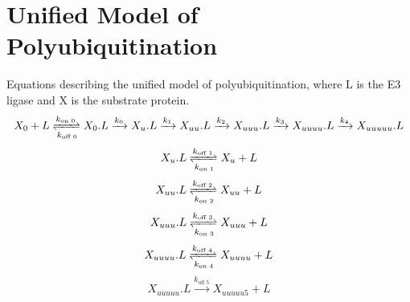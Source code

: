 \documentclass[11pt]{article}
\begin{document}
\section{Unified Model of Polyubiquitination}
Equations describing the unified model of polyubiquitination, where L is the E3 ligase and X is the substrate protein.
\begin{equation}
  X_0 + L \xrightleftharpoons[k_\text{off 0}]{k_\text{on 0}} X_0.L
  \xrightarrow[]{k_0} X_u.L
  \xrightarrow[]{k_1} X_{uu}.L
  \xrightarrow[]{k_2} X_{uuu}.L
  \xrightarrow[]{k_3} X_{uuuu}.L
  \xrightarrow[]{k_4} X_{uuuuu}.L
\end{equation}
\begin{equation}
  X_u.L \xrightleftharpoons[k_\text{on 1}]{k_\text{off 1}} X_{u} + L
\end{equation}
\begin{equation}
  X_{uu}.L \xrightleftharpoons[k_\text{on 2}]{k_\text{off 2}} X_{uu} + L
\end{equation}
\begin{equation}
  X_{uuu}.L \xrightleftharpoons[k_\text{on 3}]{k_\text{off 3}} X_{uuu} + L
\end{equation}
\begin{equation}
  X_{uuuu}.L \xrightleftharpoons[k_\text{on 4}]{k_\text{off 4}} X_{uuuu} + L
\end{equation}
\begin{equation}
  X_{uuuuu}.L \xrightarrow[]{k_\text{off 5}} X_{uuuuu 5} + L
\end{equation}
\end{document}
